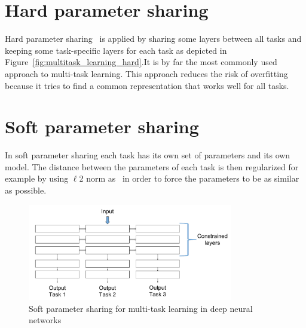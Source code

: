 \section{Hard parameter sharing}
Hard parameter sharing~\cite{caruanamultitask} is applied by sharing some layers between all tasks and keeping some task-specific layers for each task as depicted in Figure~\ref{fig:multitask_learning_hard}.It is by far the most commonly used approach to multi-task learning. This approach reduces the risk of overfitting because it tries to find a common representation that works well for all tasks.


\section{Soft parameter sharing}
In soft parameter sharing each task has its own set of parameters and its own model. The distance between the parameters of each task is then regularized for example by using $\ell$2 norm as~\cite{duong2015low} in order to force the parameters to be as similar as possible.  

\begin{figure}[H]
    \begin{center}
    \includegraphics[width=0.8\textwidth]{images/multitask_learning_soft.pdf}
    \end{center}
    \caption{Soft parameter sharing for multi-task learning in deep neural networks} \label{fig:multitask_learning_soft}
\end{figure}

